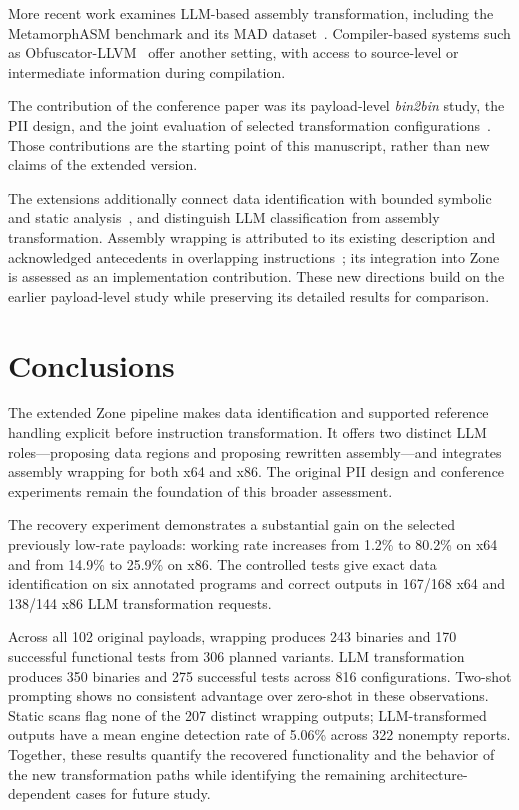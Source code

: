 \documentclass[runningheads]{llncs}
\begin{document}
More recent work examines LLM-based assembly transformation, including the MetamorphASM benchmark and its MAD dataset~\cite{llmobf,llm2}. Compiler-based systems such as Obfuscator-LLVM~\cite{llvmobf} offer another setting, with access to source-level or intermediate information during compilation.

The contribution of the conference paper was its payload-level \emph{bin2bin} study, the PII design, and the joint evaluation of selected transformation configurations~\cite{zone_secrypt_2026}. Those contributions are the starting point of this manuscript, rather than new claims of the extended version.


The extensions additionally connect data identification with bounded
symbolic and static analysis~\cite{angr_cfg_docs}, and distinguish LLM
classification from assembly transformation. Assembly wrapping is
attributed to its existing description and acknowledged antecedents
in overlapping instructions~\cite{assembly_wrapping}; its integration
into Zone is assessed as an implementation contribution. These new
directions build on the earlier payload-level study while preserving
its detailed results for comparison.

\section{Conclusions}\label{sec:conclusion3}
The extended Zone pipeline makes data identification and supported
reference handling explicit before instruction transformation. It offers
two distinct LLM roles---proposing data regions and proposing rewritten
assembly---and integrates assembly wrapping for both x64 and x86.
The original PII design and conference experiments remain the foundation
of this broader assessment.

The recovery experiment demonstrates a substantial gain on the selected
previously low-rate payloads: working rate increases from 1.2\% to 80.2\%
on x64 and from 14.9\% to 25.9\% on x86. The controlled tests give exact
data identification on six annotated programs and correct outputs in
167/168 x64 and 138/144 x86 LLM transformation requests.

Across all 102 original payloads, wrapping produces 243 binaries and 170
successful functional tests from 306 planned variants. LLM transformation
produces 350 binaries and 275 successful tests across 816 configurations.
Two-shot prompting shows no consistent advantage over zero-shot in these
observations. Static scans flag none of the 207 distinct wrapping outputs;
LLM-transformed outputs have a mean engine detection rate of 5.06\% across
322 nonempty reports. Together, these results quantify the recovered
functionality and the behavior of the new transformation paths while
identifying the remaining architecture-dependent cases for future study.
\end{document}
